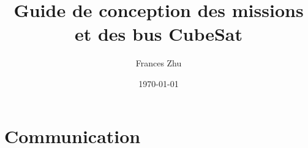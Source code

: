 \documentclass[a4paper,12pt]{book} %
\begin{document}
\title{Guide de conception des missions et des bus CubeSat}
\author{Frances Zhu}
\date{\today}
\maketitle %
\tableofcontents %
\chapter{Communication} 
 










 
\end{document}
